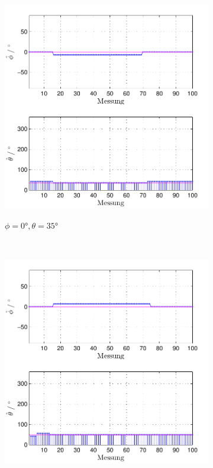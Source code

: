 \begin{figure}
\begin{subfigure}[b]{0.48\textwidth}
                \includegraphics[width=\textwidth]{images/04_Echtzeitversuch/MALE_Phi_0_Theta_35}
                \label{fig:Foto_DSP_Draufsicht}
                \caption{$\phi=0°, \theta = 35°$}
        \end{subfigure}
        ~ %
        \begin{subfigure}[b]{0.48\textwidth}
                \centering
                \includegraphics[width=\textwidth]{images/04_Echtzeitversuch/MALE_Phi_0_Theta_49}

\end{subfigure}
\end{figure}

